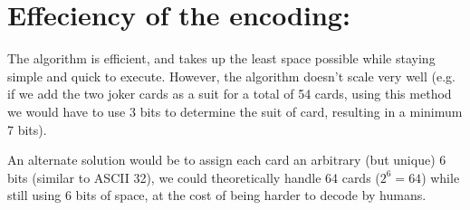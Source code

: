 \documentclass{scrartcl}
\begin{document}
\section{Effeciency of the encoding:}
\label{sec:org4b67df7}
The algorithm is efficient, and takes up the least space possible while staying simple and quick to execute. However, the algorithm doesn't scale very well (e.g. if we add the two joker cards as a suit for a total of 54 cards, using this method we would have to use 3 bits to determine the suit of card, resulting in a minimum 7 bits).

An alternate solution would be to assign each card an arbitrary (but unique) 6 bits (similar to ASCII 32), we could theoretically handle 64 cards  (\(2^6 = 64\)) while still using 6 bits of space, at the cost of being harder to decode by humans.
\end{document}

